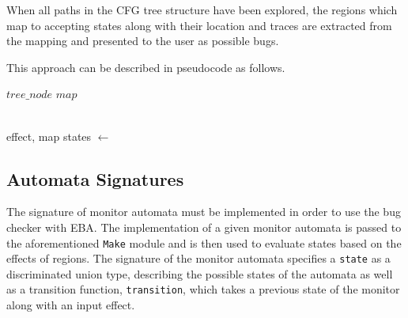 \newpar When all paths in the CFG tree structure have been explored, the regions which map to accepting states along with their location and traces are extracted from the mapping and presented to the user as possible bugs. 

\newpar This approach can be described in pseudocode as follows.

\begin{algorithm}[H]
\begin{algorithmic}
     {$tree\_node$} {$map$} 
            \EndIf
            

        \EndIf      
    \EndFunction
    \\
     {effect, map}
        \State states $\gets$ 
    \EndFunction
    \\
\end{algorithmic}
\end{algorithm}

\subsection{Automata Signatures}

The signature of monitor automata must be implemented in order to use the bug checker with EBA. The implementation of a given monitor automata is passed to the aforementioned \texttt{Make} module and is then used to evaluate states based on the effects of regions. The signature of the monitor automata specifies a \texttt{state} as a discriminated union type, describing the possible states of the automata as well as a transition function, \texttt{transition}, which takes a previous state of the monitor along with an input effect. 

